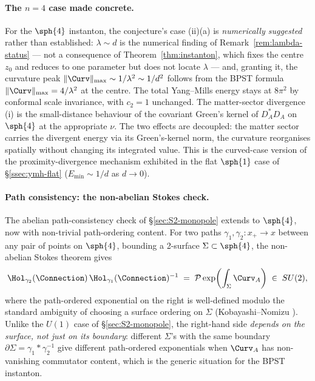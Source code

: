 \paragraph{The $n=4$ case made concrete.} For the $\sph{4}$
instanton, the conjecture's case (ii)(a) is \emph{numerically
suggested} rather than established: $\lambda\sim d$ is the
numerical finding of Remark~\ref{rem:lambda-status} --- not a
consequence of Theorem~\ref{thm:instanton}, which fixes the centre
$z_0$ and reduces to one parameter but does not locate $\lambda$ ---
and, granting it, the curvature peak
$\|\Curv\|_{\max}\sim 1/\lambda^2\sim 1/d^2$ follows from the BPST
formula $\|\Curv\|_{\max}=4/\lambda^2$ at the centre. The total
Yang--Mills energy stays at $8\pi^2$ by conformal scale invariance,
with $c_2=1$ unchanged. The matter-sector divergence (i) is the
small-distance behaviour of the covariant Green's kernel
of $D_A^*D_A$ on $\sph{4}$ at the appropriate $\nu$. The two
effects are decoupled: the matter sector carries the divergent
energy via its Green's-kernel norm, the curvature reorganises
spatially without changing its integrated value. This is the
curved-case version of the proximity-divergence mechanism exhibited
in the flat $\sph{1}$ case of \S\ref{ssec:ymh-flat}
($E_{\min}\sim 1/d$ as $d\to 0$).

\paragraph{Path consistency: the non-abelian Stokes check.} The
abelian path-consistency check of \S\ref{sec:S2-monopole} extends
to $\sph{4}$, now with non-trivial path-ordering content. For two
paths $\gamma_1,\gamma_2\colon x_+\to x$ between any pair of points
on $\sph{4}$, bounding a 2-surface $\Sigma\subset\sph{4}$, the
non-abelian Stokes theorem gives
\[
   \Hol_{\gamma_2}(\Connection)\,\Hol_{\gamma_1}(\Connection)^{-1}
   \;=\; \mathcal{P}\exp\!\left(\int_\Sigma \Curv_A\right) \;\in\; SU(2),
\]
where the path-ordered exponential on the right is well-defined
modulo the standard ambiguity of choosing a surface ordering on
$\Sigma$ (Kobayashi--Nomizu \cite{KobayashiNomizu}). Unlike the
$U(1)$ case of \S\ref{sec:S2-monopole}, the right-hand side
\emph{depends on the surface, not just on its boundary}: different
$\Sigma$'s with the same boundary $\partial\Sigma=\gamma_1*\gamma_2^{-1}$
give different path-ordered exponentials when $\Curv_A$ has
non-vanishing commutator content, which is the generic situation
for the BPST instanton.

